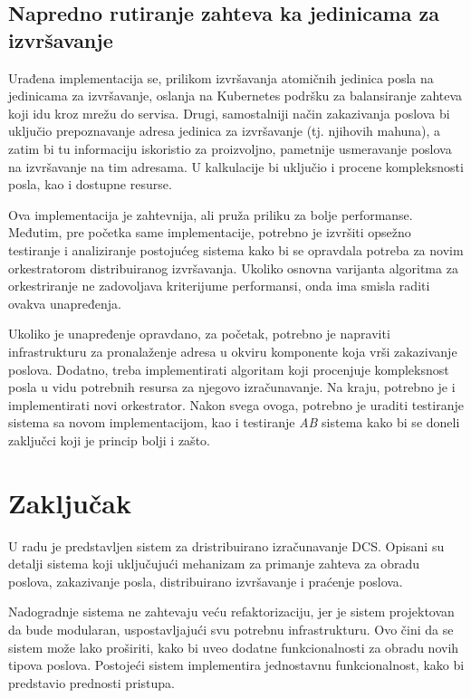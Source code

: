 \documentclass[12pt,oneside]{memoir}
\begin{document}
\subsection{Napredno rutiranje zahteva ka jedinicama za izvršavanje}

Urađena implementacija se, prilikom izvršavanja atomičnih jedinica posla na jedinicama za izvršavanje, oslanja na Kubernetes podršku za balansiranje zahteva koji idu kroz mrežu do servisa. Drugi, samostalniji način zakazivanja poslova bi uključio prepoznavanje adresa jedinica za izvršavanje (tj. njihovih mahuna), a zatim bi tu informaciju iskoristio za proizvoljno, pametnije usmeravanje poslova na izvršavanje na tim adresama. U kalkulacije bi uključio i procene kompleksnosti posla, kao i dostupne resurse.

Ova implementacija je zahtevnija, ali pruža priliku za bolje performanse. Međutim, pre početka same implementacije, potrebno je izvršiti opsežno testiranje i analiziranje postojućeg sistema kako bi se opravdala potreba za novim orkestratorom distribuiranog izvršavanja. Ukoliko osnovna varijanta algoritma za orkestriranje ne zadovoljava kriterijume performansi, onda ima smisla raditi ovakva unapređenja.

Ukoliko je unapređenje opravdano, za početak, potrebno je napraviti infrastrukturu za pronalaženje adresa u okviru komponente koja vrši zakazivanje poslova. Dodatno, treba implementirati algoritam koji procenjuje kompleksnost posla u vidu potrebnih resursa za njegovo izračunavanje. Na kraju, potrebno je i implementirati novi orkestrator. Nakon svega ovoga, potrebno je uraditi testiranje sistema sa novom implementacijom, kao i testiranje \emph{AB} sistema kako bi se doneli zaključci koji je princip bolji i zašto.

\section{Zaključak}
U radu je predstavljen sistem za dristribuirano izračunavanje DCS. Opisani su detalji sistema koji uključujući mehanizam za primanje zahteva za obradu poslova, zakazivanje posla, distribuirano izvršavanje i praćenje poslova.

Nadogradnje sistema ne zahtevaju veću refaktorizaciju, jer je sistem projektovan da bude modularan, uspostavljajući svu potrebnu infrastrukturu. Ovo čini da se sistem može lako proširiti, kako bi uveo dodatne funkcionalnosti za obradu novih tipova poslova. Postojeći sistem implementira jednostavnu funkcionalnost, kako bi predstavio prednosti pristupa.
\end{document}
